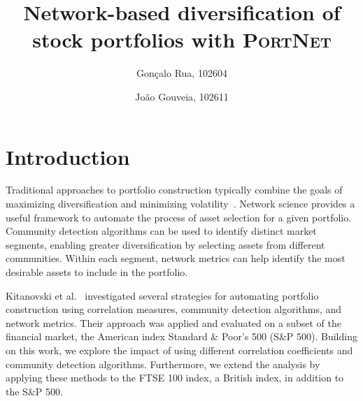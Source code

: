 \documentclass[acmsmall,screen,nonacm]{acmart}
\begin{document}
\title{Network-based diversification of stock portfolios with \textsc{PortNet}}

\author{Gonçalo Rua, 102604}
\author{João Gouveia, 102611}
\authornotemark[1]

\renewcommand{\shortauthors}{Gonçalo Rua, João Gouveia}

\maketitle

\section{Introduction}

Traditional approaches to portfolio construction typically combine the goals of maximizing diversification and minimizing volatility~\cite{kitanovski, markowitz1952}.
Network science provides a useful framework to automate the process of asset selection for a given portfolio.
Community detection algorithms can be used to identify distinct market segments, enabling greater diversification by selecting assets from different communities.
Within each segment, network metrics can help identify the most desirable assets to include in the portfolio.

Kitanovski et al.~\cite{kitanovski} investigated several strategies for automating portfolio construction using correlation measures, community detection algorithms, and network metrics.
Their approach was applied and evaluated on a subset of the financial market, the American index Standard \& Poor's 500 (S\&P 500).
Building on this work, we explore the impact of using different correlation coefficients and community detection algorithms.
Furthermore, we extend the analysis by applying these methods to the FTSE 100 index, a British index, in addition to the S\&P 500.
\end{document}
